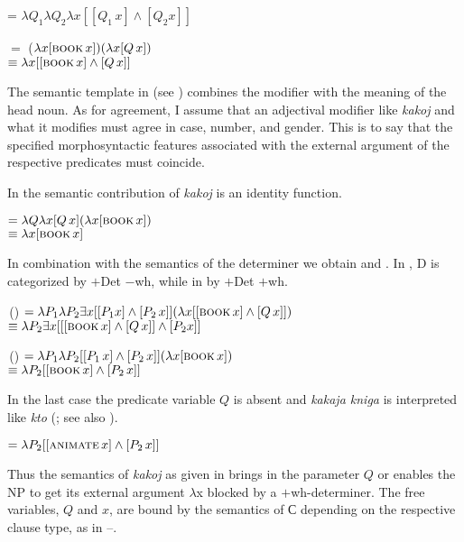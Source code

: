 \documentclass[output=paper,colorlinks,citecolor=brown]{langscibook}
\begin{document}
\ea \label{ex:zi08:30}  = $\lambda Q_1 \lambda Q_2 \lambda x [[Q_1\, x] \wedge [Q_2 x]]$
\z

\ea \label{ex:zi08:31}  $=$  ($\lambda x [\textsc{book}\, x])(\lambda x [Q\, x])$\\
$\equiv \lambda x [[\textsc{book}\, x] \wedge [Q\, x]]$ 
\z

\noindent The semantic template   in  (see \citealt{Zimmermann1992}) combines the modifier with the meaning of the head noun. As for agreement, I assume that an adjectival modifier like \textit{kakoj} and what it modifies must agree in case, number, and gender. This is to say that the specified morphosyntactic features associated with the external argument of the respective predicates must coincide. 

In  the semantic contribution of \textit{kakoj} is an identity function.

\ea \label{ex:zi08:32}  $= \lambda Q \lambda x [Q\, x](\lambda x [\textsc{book}\, x])$\\
$\equiv \lambda x [\textsc{book}\, x]$
\z

\noindent In combination with the semantics of the determiner we obtain  and . In , D is categorized by $+$Det $-$wh, while in  by $+$Det $+$wh.

\ea \label{ex:zi08:33} \sib{$\varnothing$}\,() $= \lambda P_1 \lambda P_2 \exists x [[P_1 x] \wedge [P_2\, x]](\lambda x [[\textsc{book}\, x] \wedge [Q\, x]])$\\
$\equiv \lambda P_2 \exists x [[[\textsc{book}\, x] \wedge [Q\, x]] \wedge [P_2 x]]$
\z

\ea \label{ex:zi08:34} \sib{$\varnothing$}\,() $= \lambda P_1 \lambda P_2 [[P_1\, x] \wedge [P_2\, x]](\lambda x [\textsc{book}\, x])$\\
$\equiv \lambda P_2 [[\textsc{book}\, x] \wedge [P_2\, x]]$
\z

\noindent In the last case the predicate variable $Q$ is absent and \textit{kakaja kniga} is interpreted like \textit{kto} (\citealt{zi08:Zimmermann2000}; see also \citealt[145]{Paul1958}).

\ea \label{ex:zi08:35}  $= \lambda P_2 [[\textsc{animate}\, x] \wedge [P_2\, x]]$
\z

\noindent Thus the semantics of \textit{kakoj} as given in  brings in the parameter $Q$ or enables the NP to get its external argument $\lambda$x blocked by a $+$wh-determiner. The free variables, $Q$ and $x$, are bound by the semantics of С depending on the respective clause type, as in --.
\end{document}
